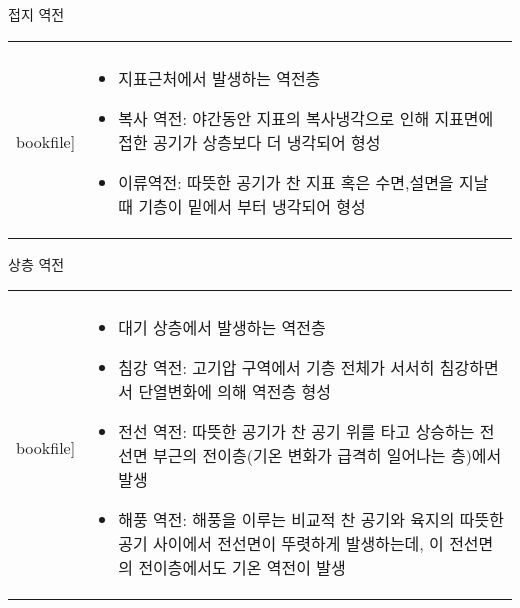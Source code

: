 \begin{frame}[t]{접지 역전}
	\begin{tabular}{ll}
		\begin{minipage}[t]{.55\textwidth}
			\begin{figure}{}
				\texttt{[image: \\bookfile]} 
			\end{figure}
		\end{minipage}
		&
		\begin{minipage}[t]{.4\textwidth}
			\begin{itemize} \scriptsize 
				\item 지표근처에서 발생하는 역전층
				\item 복사 역전: 야간동안 지표의 복사냉각으로 인해 지표면에 접한 공기가 상층보다 더 냉각되어 형성
				\item 이류역전: 따뜻한 공기가 찬 지표 혹은 수면,설면을 지날 때 기층이 밑에서 부터 냉각되어 형성
			\end{itemize}	
		\end{minipage}
	\end{tabular}
\end{frame}







\begin{frame}[t]{상층 역전}
	\begin{tabular}{ll}
		\begin{minipage}[t]{.5\textwidth}
			\begin{figure}{}
				\texttt{[image: \\bookfile]} 
			\end{figure}
		\end{minipage}
		&
		\begin{minipage}[t]{.45\textwidth}	
			
			\begin{itemize} \scriptsize 
				\item 대기 상층에서 발생하는 역전층
				\item 침강 역전: 고기압 구역에서 기층 전체가 서서히 침강하면서 단열변화에 의해 역전층 형성
				\item 전선 역전: 따뜻한 공기가 찬 공기 위를 타고 상승하는 전선면 부근의 전이층(기온 변화가 급격히 일어나는 층)에서 발생
				\item 해풍 역전: 해풍을 이루는 비교적 찬 공기와 육지의 따뜻한 공기 사이에서 전선면이 뚜렷하게 발생하는데, 이 전선면의 전이층에서도 기온 역전이 발생
			\end{itemize}
			
	
		\end{minipage}
	\end{tabular}
\end{frame}


